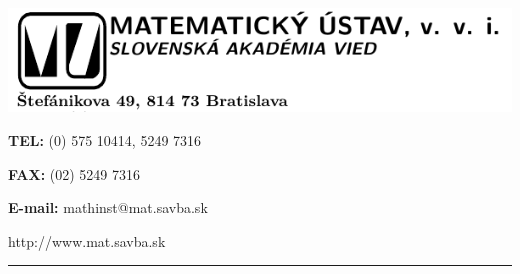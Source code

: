 \documentclass{article}
\begin{document}
\begin{minipage}{0.7\linewidth}
\vspace{0pt}\includegraphics{hlava.pdf}
\end{minipage}%
\begin{minipage}{0.4\linewidth}
\textbf{TEL:} (0) 575 10414, 5249 7316

\textbf{FAX:} (02) 5249 7316

\textbf{E-mail:} mathinst@mat.savba.sk

http://www.mat.savba.sk
\end{minipage}

\vskip 3mm

\rule{\textwidth}{0.4pt}

\medskip 

 
\end{document}
